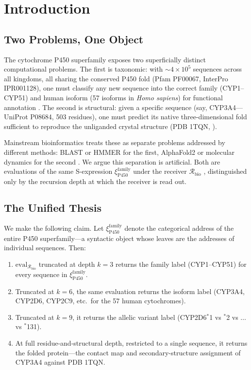 \documentclass[11pt,twocolumn,a4paper]{article}
\theoremstyle{definition}
\theoremstyle{remark}
\newcommand{\Recv}{\mathcal{R}}
\newcommand{\eval}{\mathrm{eval}}
\newcommand{\Sexp}{\xi}
\begin{document}
\section{Introduction}
\label{sec:introduction}

\subsection{Two Problems, One Object}

The cytochrome P450 superfamily exposes two superficially distinct computational problems. The first is taxonomic: with $\sim 4 \times 10^5$ sequences across all kingdoms, all sharing the conserved P450 fold (Pfam PF00067, InterPro IPR001128), one must classify any new sequence into the correct family (CYP1--CYP51) and human isoform (57 isoforms in \emph{Homo sapiens}) for functional annotation \citep{nelson2018, nelson2009}. The second is structural: given a specific sequence (say, CYP3A4---UniProt P08684, 503 residues), one must predict its native three-dimensional fold sufficient to reproduce the unliganded crystal structure (PDB 1TQN, \citep{yano2004}).

Mainstream bioinformatics treats these as separate problems addressed by different methods: BLAST or HMMER for the first, AlphaFold2 or molecular dynamics for the second \citep{altschul1990, eddy2011, jumper2021}. We argue this separation is artificial. Both are evaluations of the same S-expression $\Sexp_{\mathrm{P450}}^{\mathrm{family}}$ under the receiver $\Recv_{\mathrm{bio}}$ \citep{sachikonye2025_paper1}, distinguished only by the recursion depth at which the receiver is read out.

\subsection{The Unified Thesis}

We make the following claim. Let $\Sexp_{\mathrm{P450}}^{\mathrm{family}}$ denote the categorical address of the entire P450 superfamily---a syntactic object whose leaves are the addresses of individual sequences. Then:
\begin{enumerate}[leftmargin=*]
\item $\eval_{\Recv_{\mathrm{bio}}}$ truncated at depth $k=3$ returns the family label (CYP1--CYP51) for every sequence in $\Sexp_{\mathrm{P450}}^{\mathrm{family}}$.
\item Truncated at $k=6$, the same evaluation returns the isoform label (CYP3A4, CYP2D6, CYP2C9, etc.\ for the 57 human cytochromes).
\item Truncated at $k=9$, it returns the allelic variant label (CYP2D6$^*$1 vs $^*$2 vs $\ldots$ vs $^*$131).
\item At full residue-and-structural depth, restricted to a single sequence, it returns the folded protein---the contact map and secondary-structure assignment of CYP3A4 against PDB 1TQN.
\end{enumerate}
\end{document}
